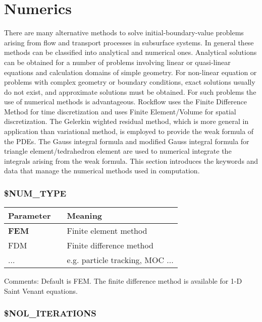 \section{Numerics}
There are many alternative methods to solve initial-boundary-value problems arising from flow and transport processes in
subsurface systems. In general these methods can be classified into analytical and numerical ones. Analytical solutions
can be obtained for a number of problems involving linear or quasi-linear equations and calculation domains of simple
geometry. For non-linear equation or problems with complex geometry or boundary conditions, exact solutions usually do not
 exist, and approximate solutions must be obtained. For such problems the use of numerical methods is advantageous. Rockflow
 uses the Finite Difference Method for time discretization and  uses Finite Element/Volume for spatial discretization.
 The Gelerkin wighted residual method, which is more general in application than variational method, is employed to
 provide the weak formula of the PDEs. The Gauss integral formula and modified Gauss integral formula for triangle
 element/tedrahedron element are used to numerical integrate the integrals arising from the weak formula. This section
 introduces the keywords and data that manage the numerical methods used in computation.



\subsubsection{\bf\$NUM\_TYPE}

\begin{tabular*}{12.773cm}{|p{}|p{1.5cm}|p{7cm}|} \hline
Parameter          &  & Meaning \\ \hline \hline
%
\bf FEM    &  & Finite element method \\
FDM    &  & Finite difference method \\
...    &  & e.g. particle tracking, MOC ... \\
\hline
\end{tabular*}

Comments: Default is FEM. The finite difference method is
available for 1-D Saint Venant equations.

\subsubsection{\bf\$NOL\_ITERATIONS}

